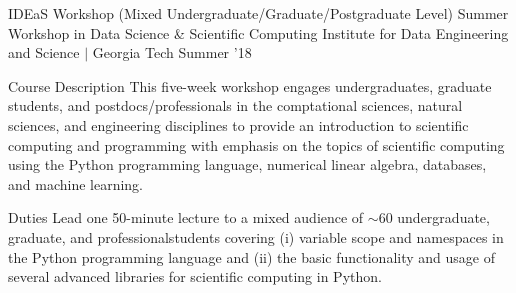 \begin{cventries}
  \cvteachingentry
    {IDEaS Workshop (Mixed Undergraduate/Graduate/Postgraduate Level)} %
    {Summer Workshop in Data Science \& Scientific Computing} %
    {Institute for Data Engineering and Science $\vert$ Georgia Tech} %
    {Summer '18} %
    {%
    \begin{cvdescription}
    \item[Course Description] This five-week workshop engages undergraduates,
        graduate students, and postdocs/professionals in the comptational sciences,
        natural sciences, and engineering disciplines to provide an introduction to
        scientific computing and programming with emphasis on the topics of scientific
        computing using the Python programming language, numerical linear algebra,
        databases, and machine learning.
    \item[Duties] Lead one 50-minute lecture to a mixed audience of $\sim$60
        undergraduate, graduate, and professionalstudents covering (i) variable scope
        and namespaces in the Python programming language and (ii) the basic functionality 
        and usage of several advanced libraries for scientific computing in Python.
    \end{cvdescription}
    }

\end{cventries}


